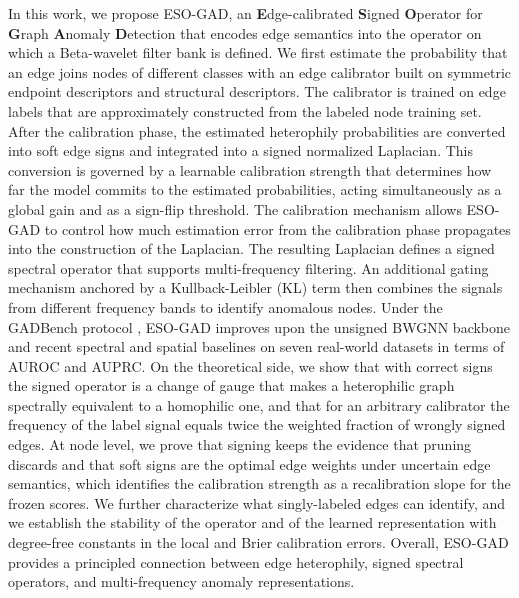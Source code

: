 In this work, we propose ESO-GAD, an \textbf{E}dge-calibrated \textbf{S}igned \textbf{O}perator for \textbf{G}raph \textbf{A}nomaly \textbf{D}etection that encodes edge semantics into the operator on which a Beta-wavelet filter bank is defined.
We first estimate the probability that an edge joins nodes of different classes with an edge calibrator built on symmetric endpoint descriptors and structural descriptors.
The calibrator is trained on edge labels that are approximately constructed from the labeled node training set.
After the calibration phase, the estimated heterophily probabilities are converted into soft edge signs and integrated into a signed normalized Laplacian.
This conversion is governed by a learnable calibration strength that determines how far the model commits to the estimated probabilities, acting simultaneously as a global gain and as a sign-flip threshold.
The calibration mechanism allows ESO-GAD to control how much estimation error from the calibration phase propagates into the construction of the Laplacian.
The resulting Laplacian defines a signed spectral operator that supports multi-frequency filtering.
An additional gating mechanism anchored by a Kullback-Leibler (KL) term then combines the signals from different frequency bands to identify anomalous nodes.
Under the GADBench protocol \citep{GADBench}, ESO-GAD improves upon the unsigned BWGNN backbone and recent spectral and spatial baselines on seven real-world datasets in terms of AUROC and AUPRC.
On the theoretical side, we show that with correct signs the signed operator is a change of gauge that makes a heterophilic graph spectrally equivalent to a homophilic one, and that for an arbitrary calibrator the frequency of the label signal equals twice the weighted fraction of wrongly signed edges.
At node level, we prove that signing keeps the evidence that pruning discards and that soft signs are the optimal edge weights under uncertain edge semantics, which identifies the calibration strength as a recalibration slope for the frozen scores.
We further characterize what singly-labeled edges can identify, and we establish the stability of the operator and of the learned representation with degree-free constants in the local and Brier calibration errors.
Overall, ESO-GAD provides a principled connection between edge heterophily, signed spectral operators, and multi-frequency anomaly representations.
